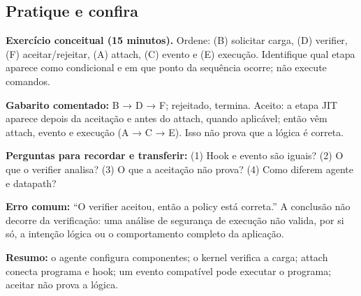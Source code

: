 \documentclass[12pt,openany,oneside,a4paper,chapter=TITLE,english,brazil]{abntex2}
\begin{document}
\subsection*{Pratique e confira}\label{pratique-e-confira}

\textbf{Exercício conceitual (15 minutos).} Ordene: (B) solicitar carga, (D) verifier, (F) aceitar/rejeitar, (A) attach, (C) evento e (E) execução. Identifique qual etapa aparece como condicional e em que ponto da sequência ocorre; não execute comandos.

\textbf{Gabarito comentado:} B → D → F; rejeitado, termina. Aceito: a etapa JIT aparece depois da aceitação e antes do attach, quando aplicável; então vêm attach, evento e execução (A → C → E). Isso não prova que a lógica é correta.

\textbf{Perguntas para recordar e transferir:} (1) Hook e evento são iguais? (2) O que o verifier analisa? (3) O que a aceitação não prova? (4) Como diferem agente e datapath?

\textbf{Erro comum:} ``O verifier aceitou, então a policy está correta.'' A conclusão não decorre da verificação: uma análise de segurança de execução não valida, por si só, a intenção lógica ou o comportamento completo da aplicação.

\textbf{Resumo:} o agente configura componentes; o kernel verifica a carga; attach conecta programa e hook; um evento compatível pode executar o programa; aceitar não prova a lógica.
\end{document}
